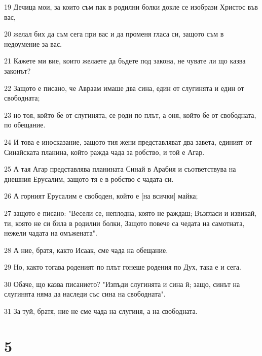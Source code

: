 \par 19 Дечица мои, за които съм пак в родилни болки докле се изобрази Христос във вас,
\par 20 желал бих да съм сега при вас и да променя гласа си, защото съм в недоумение за вас.
\par 21 Кажете ми вие, които желаете да бъдете под закона, не чувате ли що казва законът?
\par 22 Защото е писано, че Авраам имаше два сина, един от слугинята и един от свободната;
\par 23 но тоя, който бе от слугинята, се роди по плът, а оня, който бе от свободната, по обещание.
\par 24 И това е иносказание, защото тия жени представляват два завета, единият от Синайската планина, който ражда чада за робство, и той е Агар.
\par 25 А тая Агар представлява планината Синай в Арабия и съответствува на днешния Ерусалим, защото тя е в робство с чадата си.
\par 26 А горният Ерусалим е свободен, който е [на всички] майка;
\par 27 защото е писано: "Весели се, неплодна, която не раждаш; Възгласи и извикай, ти, която не си била в родилни болки, Защото повече са чедата на самотната, нежели чадата на омъжената".
\par 28 А ние, братя, както Исаак, сме чада на обещание.
\par 29 Но, както тогава роденият по плът гонеше родения по Дух, така е и сега.
\par 30 Обаче, що казва писанието? "Изпъди слугинята и сина й; защо, синът на слугинята няма да наследи със сина на свободната".
\par 31 За туй, братя, ние не сме чада на слугиня, а на свободната.

\chapter{5}

